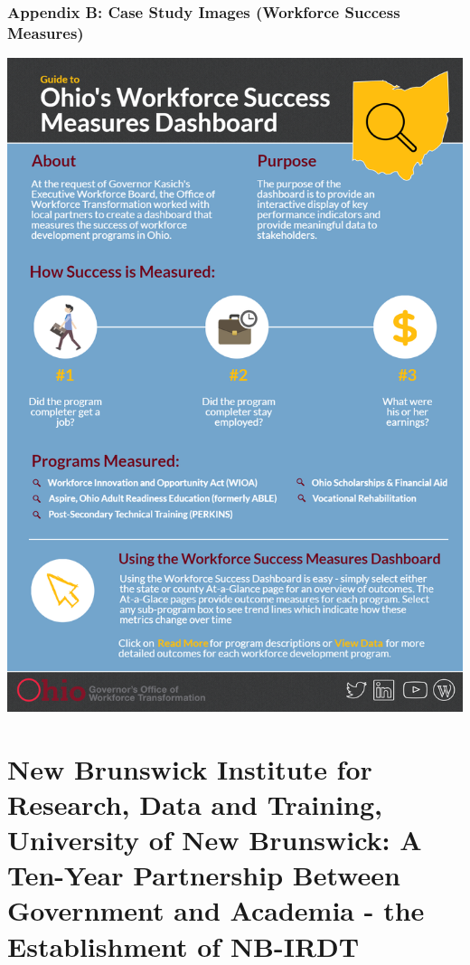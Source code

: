\documentclass[
]{book}
\begin{document}
\hypertarget{appendix-b-case-study-images-workforce-success-measures}{%
\subsection*{Appendix B: Case Study Images (Workforce Success Measures)}\label{appendix-b-case-study-images-workforce-success-measures}}

\includegraphics[width=1\linewidth]{./assets/olda/appendixb}

\hypertarget{nbirdt}{%
\chapter{New Brunswick Institute for Research, Data and Training, University of New Brunswick: A Ten-Year Partnership Between Government and Academia - the Establishment of NB-IRDT}\label{nbirdt}}
\end{document}

